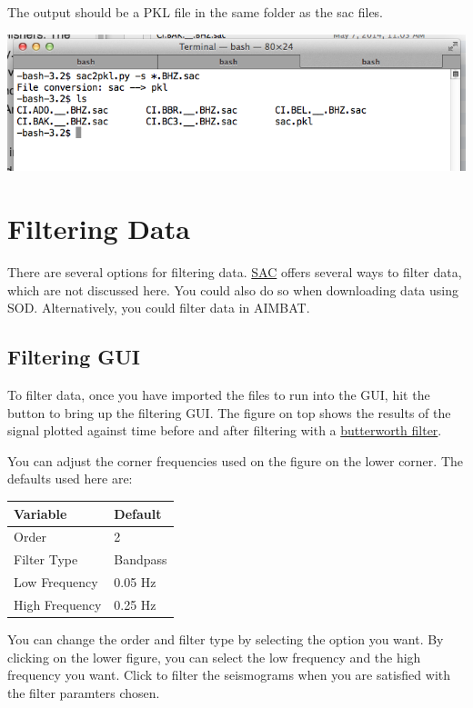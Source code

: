 \documentclass[letterpaper,10pt,english]{sphinxmanual}
\begin{document}
The output should be a PKL file in the same folder as the sac files.

\includegraphics{sac_to_pkl_conversion.png}


\chapter{Filtering Data}
\label{docfiles/filteringData::doc}\label{docfiles/filteringData:filtering-data}
There are several options for filtering data. \href{http://www.iris.edu/files/sac-manual/}{SAC} offers several ways to filter data, which are not discussed here. You could also do so when downloading data using SOD. Alternatively, you could filter data in AIMBAT.


\section{Filtering GUI}
\label{docfiles/filteringData:filtering-gui}
To filter data, once you have imported the files to run into the GUI, hit the  button to bring up the filtering GUI. The figure on top shows the results of the signal plotted against time before and after filtering with a \href{http://en.wikipedia.org/wiki/Butterworth\_filter}{butterworth filter}.

You can adjust the corner frequencies used on the figure on the lower corner. The defaults used here are:

\begin{tabulary}{\linewidth}{|L|L|}
\hline
\textsf{\relax 
Variable
} & \textsf{\relax 
Default
}\\
\hline
Order
 & 
2
\\

Filter Type
 & 
Bandpass
\\

Low Frequency
 & 
0.05 Hz
\\

High Frequency
 & 
0.25 Hz
\\
\hline\end{tabulary}


You can change the order and filter type by selecting the option you want. By clicking on the lower figure, you can select the low frequency and the high frequency you want. Click  to filter the seismograms when you are satisfied with the filter paramters chosen.
\end{document}
